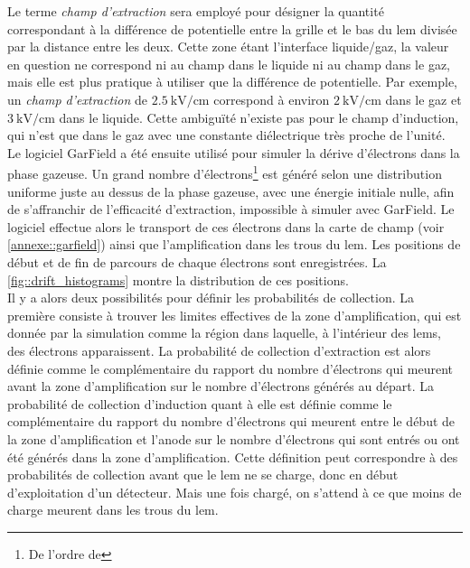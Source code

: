             Le terme \textit{champ d'extraction} sera employé pour désigner la quantité correspondant à la différence de potentielle entre la grille et le bas du \gls{lem} divisée par la distance entre les deux. Cette zone étant l'interface liquide/gaz, la valeur en question ne correspond ni au champ dans le liquide ni au champ dans le gaz, mais elle est plus pratique à utiliser que la différence de potentielle. Par exemple, un \textit{champ d'extraction} de $\SI{2.5}{\kilo\volt\per\centi\meter}$ correspond à environ $\SI{2}{\kilo\volt\per\centi\meter}$ dans le gaz et $\SI{3}{\kilo\volt\per\centi\meter}$ dans le liquide. Cette ambiguïté n'existe pas pour le champ d'induction, qui n'est que dans le gaz avec une constante diélectrique très proche de l'unité.\\
            
            Le logiciel GarField a été ensuite utilisé pour simuler la dérive d'électrons dans la phase gazeuse. Un grand nombre d'électrons\footnote{De l'ordre de } est généré selon une distribution uniforme juste au dessus de la phase gazeuse, avec une énergie initiale nulle, afin de s'affranchir de l'efficacité d'extraction, impossible à simuler avec GarField. Le logiciel effectue alors le transport de ces électrons dans la carte de champ (voir \autoref{annexe::garfield}) ainsi que l'amplification dans les trous du \gls{lem}. Les positions de début et de fin de parcours de chaque électrons sont enregistrées. La \autoref{fig::drift_histograms} montre la distribution de ces positions.\\
            
            
            Il y a alors deux possibilités pour définir les probabilités de collection. La première consiste à trouver les limites effectives de la zone d'amplification, qui est donnée par la simulation comme la région dans laquelle, à l'intérieur des \glspl{lem}, des électrons apparaissent. La probabilité de collection d'extraction est alors définie comme le complémentaire du rapport du nombre d'électrons qui meurent avant la zone d'amplification sur le nombre d'électrons générés au départ. La probabilité de collection d'induction quant à elle est définie comme le complémentaire du rapport du nombre d'électrons qui meurent entre le début de la zone d'amplification et l'anode sur le nombre d'électrons qui sont entrés ou ont été générés dans la zone d'amplification. Cette définition peut correspondre à des probabilités de collection avant que le \gls{lem} ne se charge, donc en début d'exploitation d'un détecteur. Mais une fois chargé, on s'attend à ce que moins de charge meurent dans les trous du \gls{lem}.\\
            
